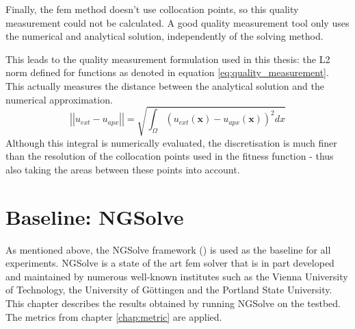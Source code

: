 \documentclass[./\jobname.tex]{subfiles}
\begin{document}
\begin{figure}[H]
	\centering
	\noindent{}
	\label{fig:aliasing error}
\end{figure}

Finally, the \gls{fem} method doesn't use collocation points, so this quality measurement could not be calculated. A good quality measurement tool only uses the numerical and analytical solution, independently of the solving method. 

This leads to the quality measurement formulation used in this thesis: the L2 norm defined for functions as denoted in equation \eqref{eq:quality_measurement}. This actually measures the distance between the analytical solution and the numerical approximation.  
\begin{equation}
\label{eq:quality_measurement}
\left|\left|u_{ext} - u_{apx}\right|\right| = \sqrt{\int_{\Omega} (u_{ext}(\mathbf{x}) - u_{apx}(\mathbf{x}))^2 dx}
\end{equation}
Although this integral is numerically evaluated, the discretisation is much finer than the resolution of the collocation points used in the fitness function - thus also taking the areas between these points into account.



\section{Baseline: NGSolve}
\label{chap:fem_baseline_results}
As mentioned above, the NGSolve framework (\cite{schoberl_ngsolvengsolve_2020}) is used as the baseline for all experiments. NGSolve is a state of the art \gls{fem} solver that is in part developed and maintained by numerous well-known institutes such as the Vienna University of Technology, the University of Göttingen and the Portland State University. This chapter describes the results obtained by running NGSolve on the testbed. The metrics from chapter \ref{chap:metric} are applied. 
\end{document}
